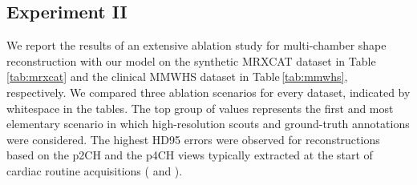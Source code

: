    \subsection{Experiment II}
     We report the results of an extensive ablation study for multi-chamber shape reconstruction with our model on the synthetic MRXCAT dataset in Table\,\ref{tab:mrxcat} and the clinical MMWHS dataset in Table\,\ref{tab:mmwhs}, respectively.
    We compared three ablation scenarios for every dataset, indicated by whitespace in the tables.
    The top group of values represents the first and most elementary scenario in which high-resolution scouts and ground-truth annotations were considered.
    The highest HD95 errors were observed for reconstructions based on the p2CH and the p4CH views typically extracted at the start of cardiac routine acquisitions ( and ).

